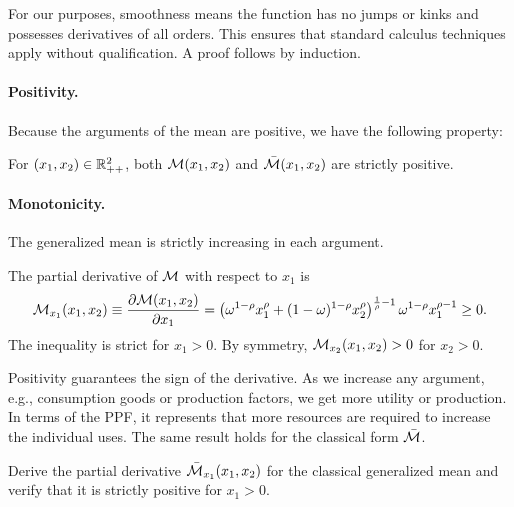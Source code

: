 \begin{remark}
For our purposes, smoothness means the function has no jumps or kinks and possesses derivatives of all orders. This ensures that standard calculus techniques apply without qualification. A proof follows by induction.
\end{remark}

\paragraph{Positivity.} Because the arguments of the mean are positive, we have the following property:
\begin{proposition}[Positivity]
\label{prop:positivity}
For $(x_1, x_2) \in \mathbb{R}_{++}^2$, both $\mathcal{M}(x_1, x_2)$ and $\bar{\mathcal{M}}(x_1, x_2)$ are strictly positive.
\end{proposition}

\paragraph{Monotonicity.}

The generalized mean is strictly increasing in each argument. 
\begin{proposition}[Monotonicity]
\label{prop:monotonicity-detailed}
The partial derivative of $\mathcal{M}$ with respect to $x_1$ is
\begin{equation}
\label{eq:partial-x1}
\mathcal{M}_{x_1}(x_1, x_2) \equiv \frac{\partial \mathcal{M}(x_1, x_2)}{\partial x_1} 
= \left( \omega^{1-\rho} x_1^\rho + (1-\omega)^{1-\rho} x_2^\rho \right)^{\frac{1}{\rho}-1} \omega^{1-\rho} x_1^{\rho-1} \geq 0.
\end{equation}
The inequality is strict for $x_1 > 0$. By symmetry, $\mathcal{M}_{x_2}(x_1, x_2) > 0$ for $x_2 > 0$.
\end{proposition}
Positivity guarantees the sign of the derivative. As we increase any argument, e.g., consumption goods or production factors, we get more utility or production. In terms of the PPF, it represents that more resources are required to increase the individual uses. The same result holds for the classical form $\bar{\mathcal{M}}$. 

\begin{callouttip}[Exercise]
Derive the partial derivative $\bar{\mathcal{M}}_{x_1}(x_1, x_2)$ for the classical generalized mean and verify that it is strictly positive for $x_1 > 0$.
\end{callouttip}

